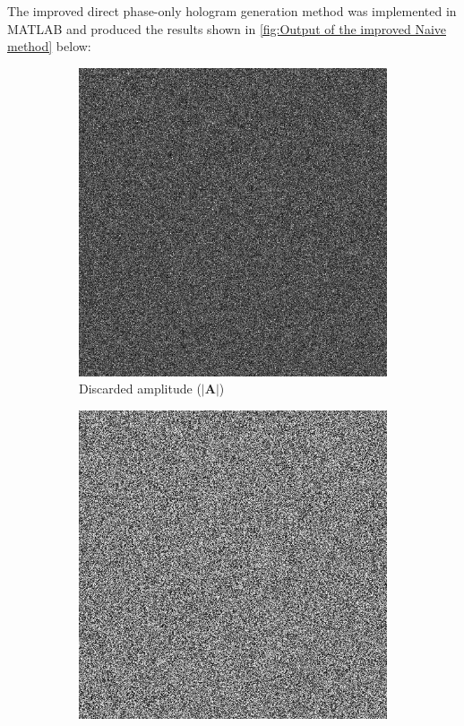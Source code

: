The improved direct phase-only hologram generation method was implemented in MATLAB and produced the results shown in \cref{fig:Output of the improved Naive method} below:

\begin{figure}[H]
  \centering
  \begin{subfigure}[t]{0.3\textwidth}
    \centering
    \includegraphics[width=\textwidth]{Naive_rand_discarded_amplitude.png}
    \caption{Discarded amplitude ($\vert \textbf{A}\vert$)}
    \label{fig:Naive_rand_discarded_amplitude}
  \end{subfigure}
  \hfill
  \begin{subfigure}[t]{0.3\textwidth}
    \centering
    \includegraphics[width=\textwidth]{Naive_rand_holo.png}

\end{subfigure}
\end{figure}
